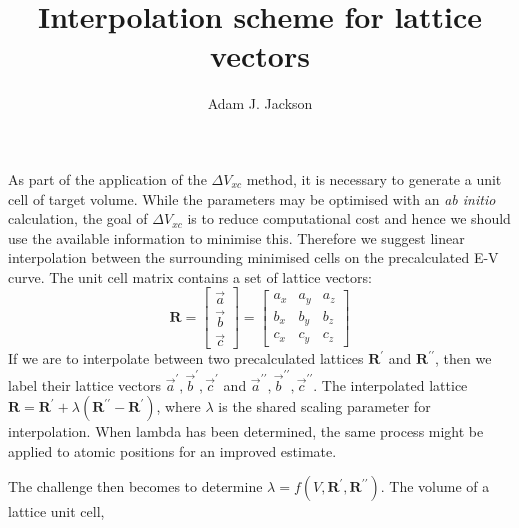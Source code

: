 \documentclass{article}
\newcommand\ap{\vec{a}^\prime}
\newcommand\app{\vec{a}^{\prime\prime}}
\newcommand\bp{\vec{b}^\prime}
\newcommand\bpp{\vec{b}^{\prime\prime}}
\newcommand\cp{\vec{c}^\prime}
\newcommand\cpp{\vec{c}^{\prime\prime}}
\begin{document}
\title{Interpolation scheme for lattice vectors}
\author{Adam J. Jackson}
\date{}

\maketitle

As part of the application of the $\Delta V_{xc}$ method, it is necessary to generate a unit cell of target volume.
While the parameters may be optimised with an \emph{ab initio} calculation, the goal of $\Delta V_{xc}$ is to reduce computational cost and hence we should use the available information to minimise this.
Therefore we suggest linear interpolation between the surrounding minimised cells on the precalculated E-V curve.
The unit cell matrix contains a set of lattice vectors:
\begin{equation}
\mathbf{R} = \left[ \begin{array}{c} \vec{a} \\ \vec{b} \\ \vec{c}\end{array} \right]
 = \left[ \begin{array}{ccc} a_x & a_y & a_z \\ b_x & b_y & b_z \\ c_x & c_y & c_z \end{array} \right]
\end{equation}
If we are to interpolate between two precalculated lattices $\mathbf{R}^\prime$ and $\mathbf{R}^{\prime\prime}$,
then we label their lattice vectors $\ap, \bp, \cp$ and $\app, \bpp, \cpp$. The interpolated lattice $\mathbf{R} = \mathbf{R}^\prime + \lambda(\mathbf{R}^{\prime\prime} - \mathbf{R}^\prime)$, where $\lambda$ is the shared scaling parameter for interpolation. 
When lambda has been determined, the same process might be applied to atomic positions for an improved estimate.

The challenge then becomes to determine $\lambda = f(V,\mathbf{R}^\prime, \mathbf{R}^{\prime\prime})$.
The volume of a lattice unit cell,
\end{document}
